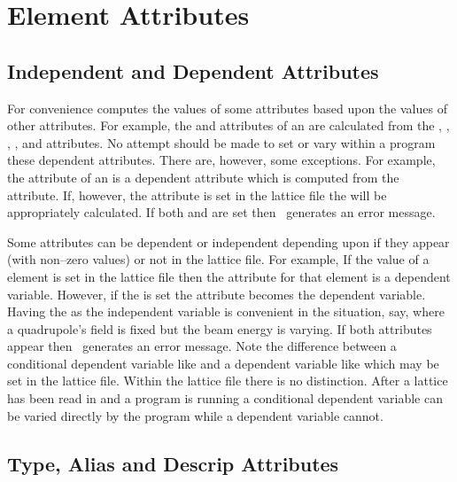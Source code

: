 \chapter {Element Attributes}

\section{Independent and Dependent Attributes}

For convenience \bmad computes the values of some attributes based
upon the values of other attributes. For example, the  and
 attributes of an  are calculated from
the , , , , and 
attributes. No attempt should be made to set or vary within a program
these dependent attributes. 
There are, however, some exceptions. For
example, the  attribute of an  is a dependent
attribute which is computed from the  attribute.  If,
however, the  attribute is set in the lattice file the
 will be appropriately calculated. If both 
and  are set then \bmad\ generates an error message. 


Some attributes can be dependent or independent depending upon if they
appear (with non--zero values) or not in the lattice file.  For
example, If the  value of a  element is set in
the lattice file then the  attribute for that element
is a dependent variable. However, if the  is set the
 attribute becomes the dependent variable. Having the
 as the independent variable is convenient in the
situation, say, where a quadrupole's field is fixed but the beam
energy is varying. If both attributes appear then \bmad\ generates an
error message. Note the difference between a conditional dependent 
variable like  and a dependent variable like  
which may be set in the lattice file. Within the lattice file there
is no distinction. After a lattice has been read in and a program is
running a conditional dependent variable can be varied directly
by the program while a dependent variable cannot.

\section{Type, Alias and Descrip Attributes}
\label{s:string}

